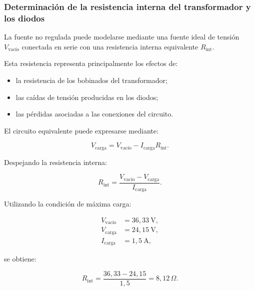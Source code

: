 \documentclass[12pt,a4paper]{article}
\begin{document}
	\subsubsection{Determinación de la resistencia interna del transformador y los diodos}
	
	La fuente no regulada puede modelarse mediante una fuente ideal de tensión
	$V_{\text{vacío}}$ conectada en serie con una resistencia interna equivalente
	$R_{\mathrm{int}}$.
	
	Esta resistencia representa principalmente los efectos de:
	
	\begin{itemize}
		
		\item la resistencia de los bobinados del transformador;
		
		\item las caídas de tensión producidas en los diodos;
		
		\item las pérdidas asociadas a las conexiones del circuito.
		
	\end{itemize}
	
	El circuito equivalente puede expresarse mediante:
	
	\begin{equation}
		V_{\text{carga}}
		=
		V_{\text{vacío}}
		-
		I_{\text{carga}}R_{\mathrm{int}}.
	\end{equation}
	
	Despejando la resistencia interna:
	
	\begin{equation}
		R_{\mathrm{int}}
		=
		\frac{
			V_{\text{vacío}}
			-
			V_{\text{carga}}
		}{
			I_{\text{carga}}
		}.
	\end{equation}
	
	Utilizando la condición de máxima carga:
	
	\begin{align}
		V_{\text{vacío}} &= 36,33~\text{V},
		\\
		V_{\text{carga}} &= 24,15~\text{V},
		\\
		I_{\text{carga}} &= 1,5~\text{A},
	\end{align}
	
	se obtiene:
	
	\begin{equation}
		R_{\mathrm{int}}
		=
		\frac{
			36,33
			-
			24,15
		}{
			1,5
		}
		=
		8,12\,\Omega.
	\end{equation}
	
\end{document}
